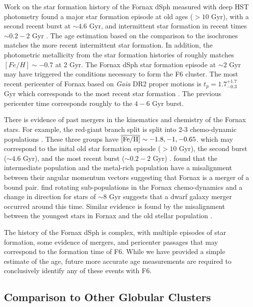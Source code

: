 \documentclass[twocolumn]{aastex63}
\begin{document}
Work on the star formation history of the Fornax dSph measured with  deep HST photometry found a major  star formation episode at old ages ($>10$ Gyr), with a second recent burst at  $\sim4.6$ Gyr, and intermittent star formation in recent times $\sim 0.2-2$ Gyr \citep{Rusakov2021MNRAS.502..642R}.
The age estimation based on the comparison to the isochrones matches the more recent intermittent star formation.  In addition, the photometric metallicity from the star formation histories of  \citet{Rusakov2021MNRAS.502..642R} roughly matches $[Fe/H]\sim -0.7$ at 2 Gyr.
The Fornax dSph star formation episode at $\sim2$ Gyr may have  triggered the conditions necessary to form the F6 cluster. 
The most recent pericenter of Fornax based on {\it Gaia} DR2 proper motions is $t_p=1.7_{-0.3}^{+1.7}$ Gyr which corresponds to the most recent star formation \citep{Rusakov2021MNRAS.502..642R}.
The previous pericenter time corresponds roughly to the $4-6$ Gyr burst.

There is evidence of past mergers in the kinematics and chemistry of the Fornax stars.
For example, the red-giant branch split is split into 2-3 chemo-dynamic populations \citep{Battaglia2006A&A...459..423B, Walker2011ApJ...742...20W, Amorisco2012ApJ...756L...2A}.
These three groups have $\overline{\rm [Fe/H]}\sim -1.8, -1, -0.65$. which may correspond to the inital old star formation episode ($>10$ Gyr), the second burst ($\sim4.6$ Gyr), and the most recent burst ($\sim 0.2-2$ Gyr) \citep{Rusakov2021MNRAS.502..642R}. 
\citet{Amorisco2012ApJ...756L...2A} found that the intermediate population and the metal-rich population have a misalignment between their angular momentum vectors suggesting that Fornax is a merger of a bound pair.
\citet{delPino2017MNRAS.465.3708D} find rotating sub-populations in the Fornax chemo-dynamics and a change in direction for stars of $\sim 8$ Gyr suggests that a dwarf galaxy merger occurred around this time.
Similar evidence is found by the misalignment between the youngest stars in Fornax and the old stellar population \citep{Wang2019ApJ...881..118W}.

The history of the Fornax dSph is complex, with multiple episodes of star formation, some evidence of mergers, and pericenter passages that may correspond to the formation time of F6. 
While we have provided a simple estimate of the age, future more accurate age measurements are required to conclusively identify any of these events with F6.



\subsection{Comparison to Other Globular Clusters}
\end{document}
